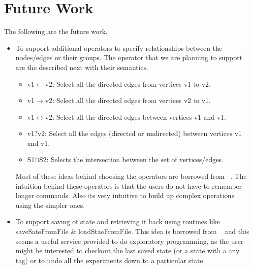 \documentclass[12,twoside]{article}
\begin{document}
\section{Future Work}
The following are the future work.
  \begin{itemize}
    \item 
      To support  additional operators to specify relationships between 
      the nodes/edges or their groups. The operator that we are planning to 
      support are the described next with their semantics.

    \begin{itemize}
      \item v1$\leftarrow$v2: Select all the directed edges from 
        vertices v1 to v2.
      \item v1$\rightarrow$v2: Select all the directed edges from 
      vertices v2 to v1.
      \item v1$\leftrightarrow$v2: Select all the directed edges 
      between vertices v1 and v1.
      \item v1$?$v2: Select all the edges (directed or undirected) 
      between vertices v1 and v1.
      \item S1$\cap$S2: Selects the intersection between the set of
      vertices/edges.
    \end{itemize}
      Most of these ideas behind choosing the operators are borrowed from 
        ~\cite{Adar}. The intuition behind these operators is that the users 
        do not have to remember longer commands. Also its very intuitive to 
          build up complex operations using the simpler ones.

    \item 
    To support saving of state and retrieving it back using
    routines like saveSateFromFile \& loadStaeFromFile.
    This idea is borrowed from ~\cite{Adar} and this seems a useful service 
    provided to do exploratory programming, as the user might be interested to 
    checkout the last saved state  (or a state with a any tag) or to undo all 
    the experiments down to a particular state.

  \end{itemize}
\end{document}
